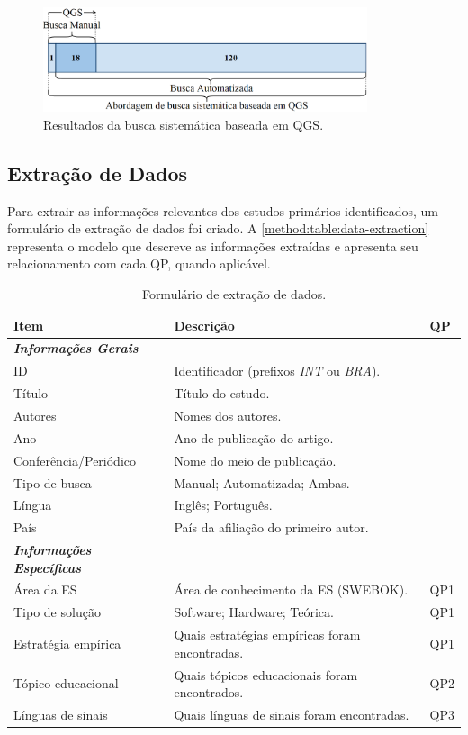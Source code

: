 \begin{figure}[htbp]
\caption{Resultados da busca sistemática baseada em QGS.}
\label{method:figure:evaluation-refinement}
\centerline{\includegraphics[width=0.85\textwidth]{images/systematic-mapping.png}}
\end{figure}

\subsection{Extração de Dados}
\label{ms:conducao-extracao-dados}

Para extrair as informações relevantes dos estudos primários identificados, um formulário de extração de dados foi criado. A \autoref{method:table:data-extraction} representa o modelo que descreve as informações extraídas e apresenta seu relacionamento com cada QP, quando aplicável.

\begin{table}[htbp]
\centering
\caption{Formulário de extração de dados.}
\label{method:table:data-extraction}
\begin{tabular}{lll}
\hline
\textbf{Item} & \textbf{Descrição} & \textbf{QP} \\ \hline
\textit{\textbf{Informações Gerais}} & & \\ \hline
ID & Identificador (prefixos \textit{INT} ou \textit{BRA}). & \\
Título & Título do estudo. & \\
Autores & Nomes dos autores. & \\
Ano & Ano de publicação do artigo. & \\
Conferência/Periódico & Nome do meio de publicação. & \\
Tipo de busca & Manual; Automatizada; Ambas. & \\
Língua & Inglês; Português. & \\
País & País da afiliação do primeiro autor. & \\ \hline
\textit{\textbf{Informações Específicas}} & & \\ \hline
Área da ES & Área de conhecimento da ES (SWEBOK). & QP1 \\
Tipo de solução & Software; Hardware; Teórica. & QP1 \\
Estratégia empírica & Quais estratégias empíricas foram encontradas. & QP1 \\
Tópico educacional & Quais tópicos educacionais foram encontrados. & QP2 \\
Línguas de sinais & Quais línguas de sinais foram encontradas. & QP3 \\ \hline
\end{tabular}
\end{table}

